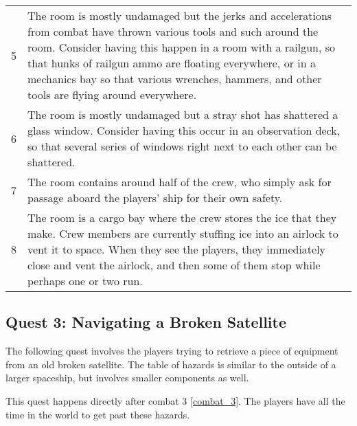 \documentclass[a4paper]{article}
\begin{document}
\begin{tabular}[t]{| c | p{12.5cm} |}
5 & The room is mostly undamaged but the jerks and accelerations from combat have thrown various tools and such around the room. Consider having this happen in a room with a railgun, so that hunks of railgun ammo are floating everywhere, or in a mechanics bay so that various wrenches, hammers, and other tools are flying around everywhere. \\
6 & The room is mostly undamaged but a stray shot has shattered a glass window. Consider having this occur in an observation deck, so that several series of windows right next to each other can be shattered. \\
7 & The room contains around half of the crew, who simply ask for passage aboard the players' ship for their own safety. \\
8 & The room is a cargo bay where the crew stores the ice that they make. Crew members are currently stuffing ice into an airlock to vent it to space. When they see the players, they immediately close and vent the airlock, and then some of them stop while perhaps one or two run. \\
\bottomrule
\end{tabular}

\subsection{Quest 3: Navigating a Broken Satellite} \label{quest_3}

The following quest involves the players trying to retrieve a piece of equipment from an old broken satellite. The table of hazards is similar to the outside of a larger spaceship, but involves smaller components as well. 

This quest happens directly after combat 3 \ref{combat_3}. The players have all the time in the world to get past these hazards.
\end{document}
